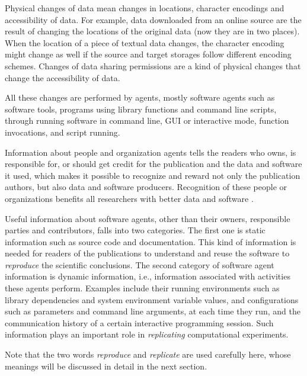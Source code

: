 Physical changes of data mean changes in locations, character encodings and accessibility of data. 
For example, data downloaded from an online source are the result of changing the locations of the 
original data (now they are in two places). When the location of a piece of textual data changes, the 
character encoding might change as well if the source and target storages follow different encoding 
schemes. Changes of data sharing permissions are a kind of physical changes that change the 
accessibility of data. 

All these changes are performed by agents, mostly software agents such as software tools, programs 
using library functions and command line scripts, through running software in command line, GUI or 
interactive mode, function invocations, and script running.

Information about people and organization agents tells the readers who owns, is responsible for, or 
should get credit for the publication and the data and software it used, which makes it possible to 
recognize and reward not only the publication authors, but also data and software producers. 
Recognition of these people or organizations benefits all researchers with better data and software 
\cite{parsons2010data, goble2014better}.

Useful information about software agents, other than their owners, responsible parties and 
contributors, falls into two categories. The first one is static information such as source code and 
documentation. This kind of information is needed for readers of the publications to understand and 
reuse the software to \emph{reproduce} the scientific conclusions. The second category of software 
agent information is dynamic information, i.e., information associated with activities these agents 
perform. Examples include their running environments such as library dependencies and system 
environment variable values, and configurations such as parameters and command line arguments, at 
each time they run, and the communication history of a certain interactive programming session. Such 
information plays an important role in \emph{replicating} computational experiments.

Note that the two words \emph{reproduce} and \emph{replicate} are used carefully here, whose meanings 
will be discussed in detail in the next section.


